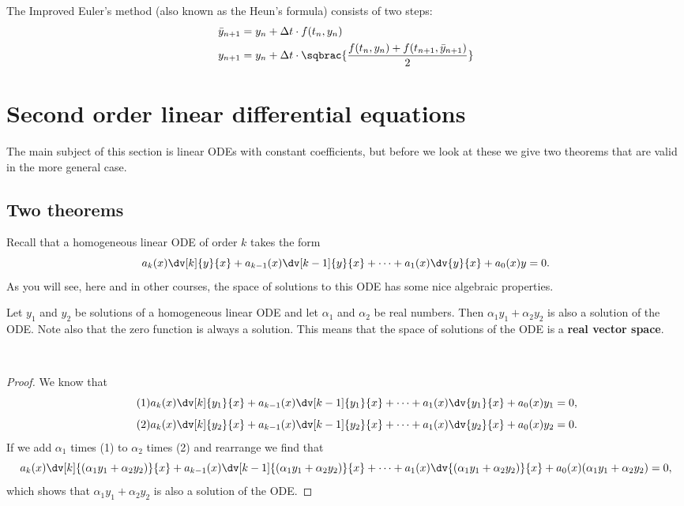 The Improved Euler's method (also known as the Heun's formula) consists of two steps:
\begin{equation}
\begin{split}
\bar{y}_{n+1}&=y_n+\Delta t\cdot f(t_n,y_n)\\
y_{n+1}&=y_n+\Delta t\cdot\sqbrac{\frac{f(t_n,y_n)+f(t_{n+1},\bar{y}_{n+1})}{2}}
\end{split}
\end{equation}
\pagebreak

\section{Second order linear differential equations}
The main subject of this section is linear ODEs with constant coefficients, but before we look at these we give two theorems that are valid in the more general case.

\subsection{Two theorems}
Recall that a homogeneous linear ODE of order $k$ takes the form
\[a_k(x)\dv[k]{y}{x}+a_{k-1}(x)\dv[k-1]{y}{x}+\cdots+a_1(x)\dv{y}{x}+a_0(x)y=0.\]
As you will see, here and in other courses, the space of solutions to this ODE has some nice algebraic properties.

\begin{theorem}
Let $y_1$ and $y_2$ be solutions of a homogeneous linear ODE and let $\alpha_1$ and $\alpha_2$ be real numbers. Then $\alpha_1y_1+\alpha_2y_2$ is also a solution of the ODE. Note also that the zero function is always a solution. This means that the space of solutions of the ODE is a \textbf{real vector space}.
\end{theorem}\

\begin{proof}
We know that
\begin{equation*}\tag{1}
a_k(x)\dv[k]{y_1}{x}+a_{k-1}(x)\dv[k-1]{y_1}{x}+\cdots+a_1(x)\dv{y_1}{x}+a_0(x)y_1=0,
\end{equation*}
\begin{equation*}\tag{2}
a_k(x)\dv[k]{y_2}{x}+a_{k-1}(x)\dv[k-1]{y_2}{x}+\cdots+a_1(x)\dv{y_2}{x}+a_0(x)y_2=0.
\end{equation*}
If we add $\alpha_1$ times (1) to $\alpha_2$ times (2) and rearrange we find that
\[a_k(x)\dv[k]{(\alpha_1y_1+\alpha_2y_2)}{x}+a_{k-1}(x)\dv[k-1]{(\alpha_1y_1+\alpha_2y_2)}{x}+\cdots+a_1(x)\dv{(\alpha_1y_1+\alpha_2y_2)}{x}+a_0(x)(\alpha_1y_1+\alpha_2y_2)=0,\]
which shows that $\alpha_1y_1+\alpha_2y_2$ is also a solution of the ODE.
\end{proof}

